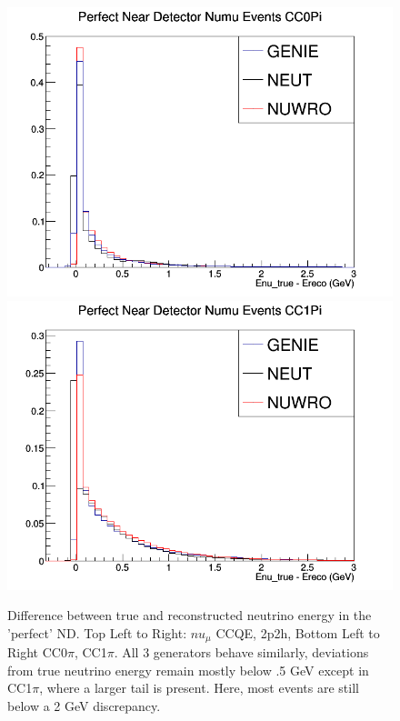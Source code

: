 \documentclass[12pt]{article}
\begin{document}
\begin{figure}[h]
\endminipage
\newline
{}
\includegraphics[width=\linewidth]{Ereco_Etrue/numu_perfect_ND_CC0Pi.png}
\endminipage
{}
\includegraphics[width=\linewidth]{Ereco_Etrue/numu_perfect_ND_CC1Pi.png}
\endminipage
\caption{Difference between true and reconstructed neutrino energy in the 'perfect' ND. Top Left to Right: $nu_\mu$ CCQE, 2p2h, Bottom Left to Right CC0$\pi$, CC1$\pi$. All 3 generators behave similarly, deviations from true neutrino energy remain mostly below .5 GeV except in CC1$\pi$, where a larger tail is present. Here, most events are still below a 2 GeV discrepancy.}
\label{fig:numu_Etrue_ereco_perfect}
\end{figure}
\FloatBarrier
\end{document}
